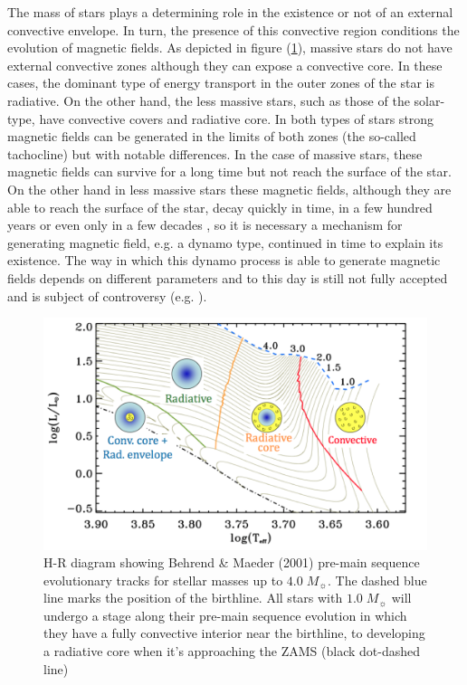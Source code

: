 \documentclass[fleqn,usenatbib]{mnras}
\begin{document}
The mass of stars plays a determining role in the existence or not of an external convective envelope. In turn, the presence of this convective region conditions the evolution of magnetic fields. As depicted in figure (\ref{fig:hr_hussain}), massive stars do not have external convective zones although they can expose a convective core. In these cases, the dominant type of energy transport in the outer zones of the star is radiative. On the other hand, the less massive stars, such as those of the solar-type, have convective covers and radiative core. In both types of stars strong magnetic fields can be generated in the limits of both zones (the so-called tachocline) but with notable differences. In the case of massive stars, these magnetic fields can survive for a long time but not reach the surface of the star. On the other hand in less massive stars these magnetic fields, although they are able to reach the surface of the star, decay quickly in time, in a few hundred years or even only in a few decades \citep{Chabrier2006}, so it is necessary a mechanism for generating magnetic field, e.g. a dynamo type, continued in time to explain its existence. The way in which this dynamo process is able to generate magnetic fields depends on different parameters and to this day is still not fully accepted and is subject of controversy (e.g. \citep{Charbonneau2010}).\par

\begin{figure}
	\includegraphics[width=\columnwidth]{figures/hussain_gaitee_fig1.png}
    \caption{H-R diagram showing Behrend \& Maeder (2001) pre-main sequence evolutionary tracks for stellar masses up to $4.0 \; M_{\sun}$. The dashed blue line marks the position of the birthline. All stars with $1.0 \; M_{\sun}$ will undergo a stage along their pre-main sequence evolution in which they have a fully convective interior near the birthline, to developing a radiative core when it's approaching the ZAMS (black dot-dashed line) \citet{Hussain2014}}
    \label{fig:hr_hussain}
\end{figure}
\end{document}
